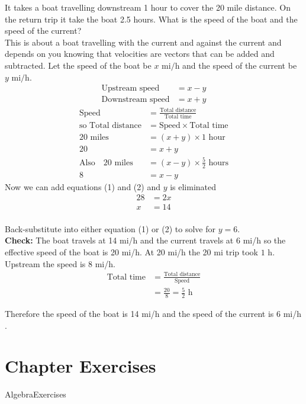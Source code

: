  \example It takes a boat travelling downstream 1 hour to cover the 20 mile distance. On the return trip it take the boat 2.5 hours. What is the speed of the boat and the speed of the current?\medskip\\
 \solution This is about a boat travelling with the current and against the current and depends on you knowing that velocities are vectors that can be added and subtracted. Let the speed of the boat be $x$ \mbox{mi}$/$\mbox{h} and the speed of the current be $y$ \mbox{mi}$/$\mbox{h}. 
 	\begin{align*}\text{Upstream speed} &  =  x -y \\
 	\text{Downstream speed} &  =  x +y\end{align*}
 	\begin{align}\text{Speed} &  =  \frac{\text{Total distance}}{\text{Total time}} \nonumber  \\
 	\text{so Total distance} &  =  \text{Speed} \times \text{Total time} \nonumber  \\
 	20 \textrm{ miles } &  =  \left (x +y\right ) \times 1 \textrm{ hour} \nonumber  \\
 	20 &=x +y \tag{1} \\
 	\text{Also}\quad 20 \textrm{ miles }&  =  \left (x -y\right ) \times \frac{5}{2} \textrm{ hours}\nonumber  \\
 	8 &=x -y \tag{2}\end{align}
 Now we can add equations (1) and (2) and $y$ is eliminated
 \begin{align*}28 &  =  2 x \\
 x &  =  14\end{align*} \\
 Back-substitute into either equation (1) or (2) to solve for $y =  6$.\medskip\\
 \textbf{Check:} The boat travels at 14 $\mbox{mi}$/$\mbox{h}$ and the current travels at 6 $\mbox{mi}$/$\mbox{h}$ so the effective speed of the boat is 20 $\mbox{mi}$/$\mbox{h}$. At 20 $\mbox{mi}$/$\mbox{h}$ the 20 $\mbox{mi}$ trip took $1$ $\mbox{h}$. Upstream the speed is 8 $\mbox{mi}$/$\mbox{h}$.
 \begin{align*}\text{Total time} &  =  \frac{\text{Total distance}}{\text{Speed}} \\
 &  =  \frac{20}{8} =\frac{5}{2} \text{ h}\end{align*}
 
 Therefore the speed of the boat is 14 $\mbox{mi}$/$\mbox{h}$ and the speed of the current is 6 $\mbox{mi}$/$\mbox{h}$. 

\section{Chapter Exercises}
{AlgebraExercises}
